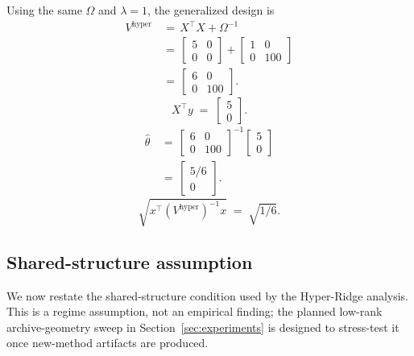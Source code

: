\documentclass{article} %
\begin{document}
Using the same \(\Omega\) and \(\lambda=1\), the generalized design is
\begin{equation}
\label{eq:hyper-example-V}
\begin{aligned}
V^{\mathrm{hyper}}
&\,=\,
X^\top X+\Omega^{-1}
\\
&\,=\,
\begin{bmatrix}
5&0\\
0&0
\end{bmatrix}
+
\begin{bmatrix}
1&0\\
0&100
\end{bmatrix}
\\
&\,=\,
\begin{bmatrix}
6&0\\
0&100
\end{bmatrix}.
\end{aligned}
\end{equation}
\begin{equation}
\label{eq:hyper-example-Xty}
X^\top y
\;=\;
\begin{bmatrix}
5\\
0
\end{bmatrix}.
\end{equation}
\begin{equation}
\label{eq:hyper-example-theta}
\begin{aligned}
\widehat{\theta}
&\,=\,
\begin{bmatrix}
6&0\\
0&100
\end{bmatrix}^{-1}
\begin{bmatrix}
5\\
0
\end{bmatrix}
\\
&\,=\,
\begin{bmatrix}
5/6\\
0
\end{bmatrix}.
\end{aligned}
\end{equation}
\begin{equation}
\label{eq:hyper-example-width}
\sqrt{x^\top (V^{\mathrm{hyper}})^{-1}x}
\;=\;
\sqrt{1/6}.
\end{equation}

\subsection{Shared-structure assumption}

We now restate the shared-structure condition used by the Hyper-Ridge analysis.  This is a regime assumption, not an empirical finding; the planned low-rank archive-geometry sweep in Section~\ref{sec:experiments} is designed to stress-test it once new-method artifacts are produced.
\end{document}
